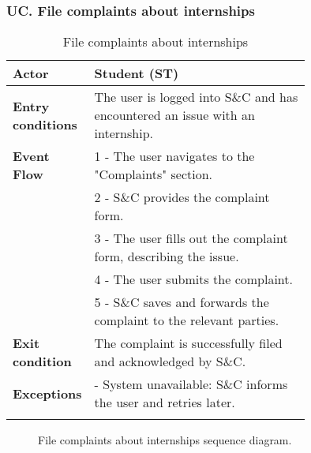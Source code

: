 \subsubsection*{UC\cuc . File complaints about internships}
\begin{center}
    \begin{longtable}{|l|p{0.75\linewidth}|}
        \hline
        \textbf{Actor}            & Student (ST) \\
        \hline
        \textbf{Entry conditions} & The user is logged into S\&C and has encountered an issue with an internship. \\
        \hline
        \textbf{Event Flow}       & 1 - The user navigates to the "Complaints" section. \\
        & 2 - S\&C provides the complaint form. \\
        & 3 - The user fills out the complaint form, describing the issue. \\
        & 4 - The user submits the complaint. \\
        & 5 - S\&C saves and forwards the complaint to the relevant parties. \\
        \hline
        \textbf{Exit condition}   & The complaint is successfully filed and acknowledged by S\&C. \\       
        \hline
        \textbf{Exceptions}       & - System unavailable: S\&C informs the user and retries later. \\
        \hline
        \caption{File complaints about internships}
        \label{tab:file_complaints_usecase}
    \end{longtable}
\end{center}

\begin{figure}[H]
    \begin{center}
        
        \caption{File complaints about internships sequence diagram.}
        \label{fig:file_complaints_seqd}%
    \end{center}
\end{figure}

